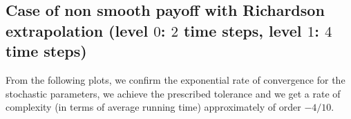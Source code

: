 \documentclass[11pt]{article}
\begin{document}
\newpage

\subsection{Case of non smooth payoff  with Richardson extrapolation (level $0$: $2$ time steps, level $1$: $4$ time steps) }






From the following plots, we confirm the exponential rate of convergence for the stochastic parameters, we achieve the prescribed tolerance and  we get a rate of complexity (in terms of average running time) approximately of order $-4/10$.
\end{document}
